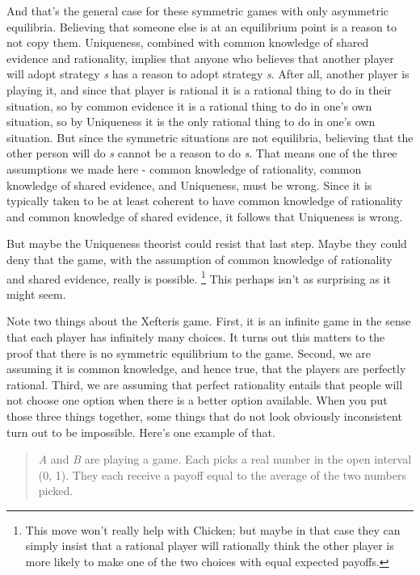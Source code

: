 \documentclass[
  12pt,
  letterpaper,
  DIV=11,
  numbers=noendperiod]{scrreprt}
\begin{document}
And that's the general case for these symmetric games with only
asymmetric equilibria. Believing that someone else is at an equilibrium
point is a reason to not copy them. Uniqueness, combined with common
knowledge of shared evidence and rationality, implies that anyone who
believes that another player will adopt strategy \emph{s} has a reason
to adopt strategy \emph{s}. After all, another player is playing it, and
since that player is rational it is a rational thing to do in their
situation, so by common evidence it is a rational thing to do in one's
own situation, so by Uniqueness it is the only rational thing to do in
one's own situation. But since the symmetric situations are not
equilibria, believing that the other person will do \emph{s} cannot be a
reason to do \emph{s}. That means one of the three assumptions we made
here - common knowledge of rationality, common knowledge of shared
evidence, and Uniqueness, must be wrong. Since it is typically taken to
be at least coherent to have common knowledge of rationality and common
knowledge of shared evidence, it follows that Uniqueness is wrong.

But maybe the Uniqueness theorist could resist that last step. Maybe
they could deny that the game, with the assumption of common knowledge
of rationality and shared evidence, really is possible. \footnote{This
  move won't really help with Chicken; but maybe in that case they can
  simply insist that a rational player will rationally think the other
  player is more likely to make one of the two choices with equal
  expected payoffs.} This perhaps isn't as surprising as it might seem.

Note two things about the Xefteris game. First, it is an infinite game
in the sense that each player has infinitely many choices. It turns out
this matters to the proof that there is no symmetric equilibrium to the
game. Second, we are assuming it is common knowledge, and hence true,
that the players are perfectly rational. Third, we are assuming that
perfect rationality entails that people will not choose one option when
there is a better option available. When you put those three things
together, some things that do not look obviously inconsistent turn out
to be impossible. Here's one example of that.

\begin{quote}
\emph{A} and \emph{B} are playing a game. Each picks a real number in
the open interval (0, 1). They each receive a payoff equal to the
average of the two numbers picked.
\end{quote}
\end{document}
